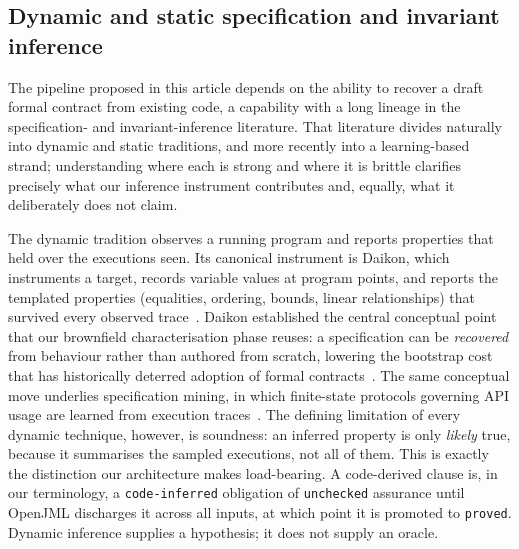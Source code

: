 \subsection{Dynamic and static specification and invariant inference}
\label{subsec:rw3}

The pipeline proposed in this article depends on the ability to recover a draft formal contract from existing code, a capability with a long lineage in the specification- and invariant-inference literature. That literature divides naturally into dynamic and static traditions, and more recently into a learning-based strand; understanding where each is strong and where it is brittle clarifies precisely what our inference instrument contributes and, equally, what it deliberately does not claim.

The dynamic tradition observes a running program and reports properties that held over the executions seen. Its canonical instrument is Daikon, which instruments a target, records variable values at program points, and reports the templated properties (equalities, ordering, bounds, linear relationships) that survived every observed trace~\cite{ernst2007daikon}. Daikon established the central conceptual point that our brownfield characterisation phase reuses: a specification can be \emph{recovered} from behaviour rather than authored from scratch, lowering the bootstrap cost that has historically deterred adoption of formal contracts~\cite{meyer1992dbc}. The same conceptual move underlies specification mining, in which finite-state protocols governing API usage are learned from execution traces~\cite{ammons2002mining}. The defining limitation of every dynamic technique, however, is soundness: an inferred property is only \emph{likely} true, because it summarises the sampled executions, not all of them. This is exactly the distinction our architecture makes load-bearing. A code-derived clause is, in our terminology, a \texttt{code-inferred} obligation of \texttt{unchecked} assurance until OpenJML discharges it across all inputs, at which point it is promoted to \texttt{proved}. Dynamic inference supplies a hypothesis; it does not supply an oracle.

